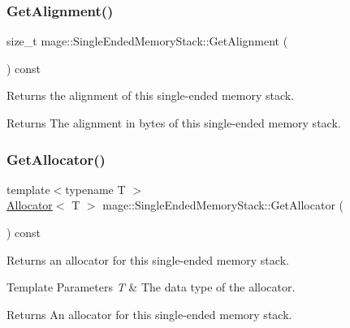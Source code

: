 \subsubsection{\texorpdfstring{Get\+Alignment()}{GetAlignment()}}
{\footnotesize\ttfamily size\+\_\+t mage\+::\+Single\+Ended\+Memory\+Stack\+::\+Get\+Alignment (\begin{DoxyParamCaption}{ }\end{DoxyParamCaption}) const\hspace{0.3cm}{\ttfamily [noexcept]}}

Returns the alignment of this single-\/ended memory stack.

\begin{DoxyReturn}{Returns}
The alignment in bytes of this single-\/ended memory stack. 
\end{DoxyReturn}
\mbox{\label{classmage_1_1_single_ended_memory_stack_a0f6be7c59dca442ac5924fadf52c126a}} 
\subsubsection{\texorpdfstring{Get\+Allocator()}{GetAllocator()}}
{\footnotesize\ttfamily template$<$typename T $>$ \\
\mbox{\hyperlink{classmage_1_1_single_ended_memory_stack_1_1_allocator}{Allocator}}$<$ T $>$ mage\+::\+Single\+Ended\+Memory\+Stack\+::\+Get\+Allocator (\begin{DoxyParamCaption}{ }\end{DoxyParamCaption}) const\hspace{0.3cm}{\ttfamily [noexcept]}}

Returns an allocator for this single-\/ended memory stack.


\begin{DoxyTemplParams}{Template Parameters}
{\em T} & The data type of the allocator. \\
\hline
\end{DoxyTemplParams}
\begin{DoxyReturn}{Returns}
An allocator for this single-\/ended memory stack. 
\end{DoxyReturn}
\mbox{\label{classmage_1_1_single_ended_memory_stack_a1c3f233b16e8fcb9770b7fe23b83485b}} 
